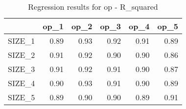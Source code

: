 \begin{table}[ht]
\centering
\caption{Regression results for op - R_squared} 
\begin{tabular}{rrrrrr}
  \hline
 & op\_1 & op\_2 & op\_3 & op\_4 & op\_5 \\ 
  \hline
SIZE\_1 & 0.89 & 0.93 & 0.92 & 0.91 & 0.89 \\ 
  SIZE\_2 & 0.91 & 0.92 & 0.90 & 0.90 & 0.86 \\ 
  SIZE\_3 & 0.91 & 0.92 & 0.91 & 0.90 & 0.87 \\ 
  SIZE\_4 & 0.90 & 0.93 & 0.91 & 0.90 & 0.89 \\ 
  SIZE\_5 & 0.89 & 0.90 & 0.90 & 0.89 & 0.91 \\ 
   \hline
\end{tabular}
\end{table}


